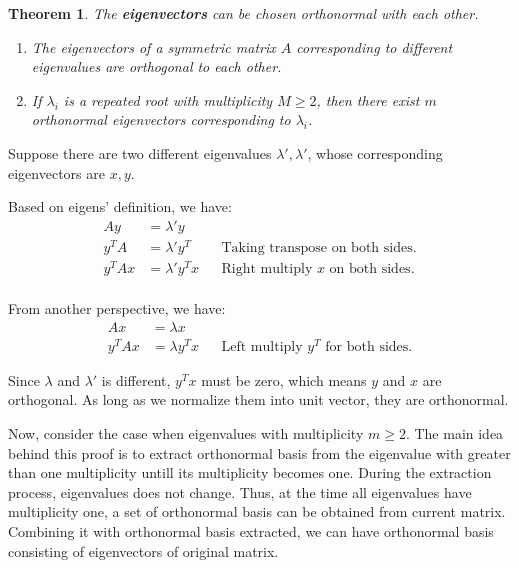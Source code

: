 \documentclass[a4paper]{book}
\newtheorem{theorem}{Theorem}[section]
\newenvironment{proof}[1][Proof]{\begin{trivlist}
\item[\hskip \labelsep {\bfseries #1}]}{\end{trivlist}}
\begin{document}
      \begin{theorem}
        The \textbf{eigenvectors} can be chosen orthonormal with each
        other.
        \begin{enumerate}
          \item The eigenvectors of a symmetric matrix $A$
            corresponding to different eigenvalues are orthogonal to
            each other.
          \item If $\lambda_{i}$ is a repeated root with multiplicity
            $M \geq 2$, then there exist $m$ orthonormal eigenvectors
            corresponding to $\lambda_{i}$.
        \end{enumerate}
      \end{theorem}

      \begin{proof}
        Suppose there are two different eigenvalues $\lambda',
        \lambda'$, whose corresponding eigenvectors are $x, y$.

        Based on eigens' definition, we have:
        \begin{align*}
          Ay      &= \lambda'y  
            &&                                          \\
          y^{T}A  &= \lambda'y^{T}  
            && \text{Taking transpose on both sides.}   \\
          y^{T}Ax  &= \lambda'y^{T}x  
            && \text{Right multiply $x$ on both sides.} \\
        \end{align*}

        From another perspective, we have:
        \begin{align*}
          Ax      &= \lambda x 
            &&                                              \\
          y^{T}Ax &= \lambda y^{T}x 
            && \text{Left multiply $y^{T}$ for both sides.}
        \end{align*}

        Since $\lambda$ and $\lambda'$ is different, $y^{T}x$ must be
        zero, which means $y$ and $x$ are orthogonal. As long as we
        normalize them into unit vector, they are orthonormal.

        Now, consider the case when eigenvalues with multiplicity $m \geq
        2$. The main idea behind this
        proof\cite{richard_some_basic_matrix_theorems} is to extract
        orthonormal basis from the eigenvalue with greater than one
        multiplicity untill its multiplicity becomes one. During the
        extraction process, eigenvalues does not change. Thus, at the
        time all eigenvalues have multiplicity one, a set of orthonormal
        basis can be obtained from current matrix. Combining it with
        orthonormal basis extracted, we can have orthonormal basis
        consisting of eigenvectors of original matrix.


\end{proof}
\end{document}
